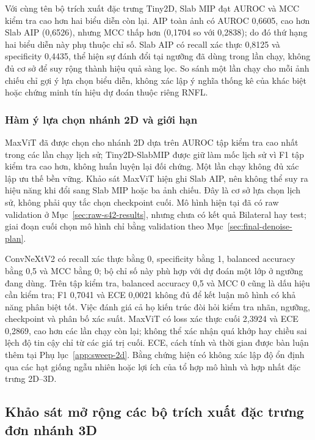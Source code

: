 \documentclass[14pt,a4paper,oneside]{extreport}
\begin{document}
Với cùng tên bộ trích xuất đặc trưng Tiny2D, Slab MIP đạt AUROC và MCC kiểm tra
cao hơn hai biểu diễn còn lại. AIP toàn ảnh có AUROC 0,6605, cao hơn
Slab AIP (0,6526), nhưng MCC thấp hơn (0,1704 so với 0,2838);
do đó thứ hạng hai biểu diễn này phụ thuộc chỉ số. Slab AIP có recall
xác thực 0,8125 và specificity 0,4435, thể hiện sự đánh đổi tại
ngưỡng đã dùng trong lần chạy, không đủ cơ sở để suy rộng thành hiệu quả sàng lọc.
So sánh một lần chạy cho mỗi ảnh chiếu chỉ gợi ý lựa chọn biểu diễn,
không xác lập ý nghĩa thống kê của khác biệt hoặc chứng minh tín hiệu dự đoán thuộc riêng RNFL.

\subsubsection{Hàm ý lựa chọn nhánh 2D và giới hạn}
MaxViT đã được chọn cho nhánh 2D dựa trên AUROC tập kiểm tra cao nhất trong các
lần chạy lịch sử; Tiny2D-SlabMIP được giữ làm mốc lịch sử vì F1 tập kiểm tra cao
hơn, không huấn luyện lại đối chứng. Một lần chạy không đủ xác lập ưu thế bền vững. Khảo sát MaxViT hiện ghi
Slab AIP, nên không thể suy ra hiệu năng khi đổi sang Slab MIP hoặc ba ảnh chiếu.
Đây là cơ sở lựa chọn lịch sử, không phải quy tắc chọn checkpoint cuối.
Mô hình hiện tại đã có raw validation ở Mục~\ref{sec:raw-s42-results},
nhưng chưa có kết quả Bilateral hay test; giai đoạn cuối chọn mô hình
chỉ bằng validation theo Mục~\ref{sec:final-denoise-plan}.

ConvNeXtV2 có recall xác thực bằng 0, specificity bằng 1, balanced
accuracy bằng 0,5 và MCC bằng 0; bộ chỉ số này phù hợp với dự đoán
một lớp ở ngưỡng đang dùng. Trên tập kiểm tra, balanced accuracy 0,5 và MCC 0
cũng là dấu hiệu cần kiểm tra; F1 0,7041 và ECE 0,0021 không đủ để
kết luận mô hình có khả năng phân biệt tốt. Việc đánh giá cả họ kiến trúc
đòi hỏi kiểm tra nhãn, ngưỡng, checkpoint và phân bố xác suất.
MaxViT có loss xác thực cuối 2,3924 và ECE 0,2869, cao hơn các lần chạy
còn lại; không thể xác nhận quá khớp hay chiều sai lệch độ tin cậy
chỉ từ các giá trị cuối. ECE, cách tính và thời gian được bàn luận
thêm tại Phụ lục~\ref{app:sweep-2d}. Bằng chứng hiện có không xác lập độ ổn định
qua các hạt giống ngẫu nhiên hoặc lợi ích của tổ hợp mô hình và hợp nhất đặc trưng 2D--3D.
\FloatBarrier

\subsection{Khảo sát mở rộng các bộ trích xuất đặc trưng đơn nhánh 3D}
\label{sec:sweep-3d-expanded}
\end{document}
